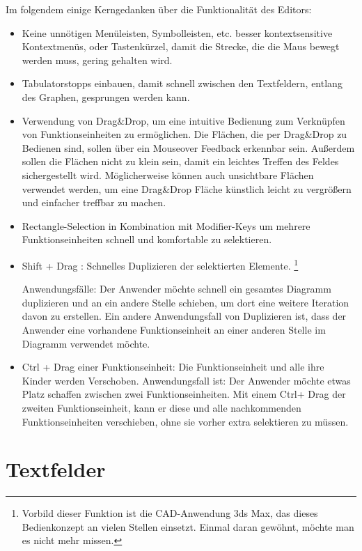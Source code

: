 \bigskip
Im folgendem einige Kerngedanken über die Funktionalität des Editors:

\begin{itemize}
\item Keine unnötigen Menüleisten, Symbolleisten, etc. besser kontextsensitive
Kontextmenüs, oder Tastenkürzel,  damit die Strecke, die die Maus bewegt werden muss, gering
gehalten wird.
\item Tabulatorstopps einbauen, damit schnell zwischen den Textfeldern, entlang des
Graphen, gesprungen werden kann.
\item Verwendung von Drag\&Drop, um eine intuitive Bedienung zum Verknüpfen von
Funktionseinheiten zu ermöglichen. Die Flächen, die per Drag\&Drop zu Bedienen
sind, sollen über ein Mouseover Feedback erkennbar sein. Außerdem sollen die
Flächen nicht zu klein sein, damit ein leichtes Treffen des Feldes
sichergestellt wird. Möglicherweise können auch unsichtbare Flächen verwendet
werden, um eine Drag\&Drop Fläche künstlich leicht zu vergrößern und einfacher treffbar zu machen.
\item Rectangle-Selection in Kombination mit Modifier-Keys um mehrere Funktionseinheiten
schnell und komfortable zu selektieren.
\item Shift + Drag : Schnelles Duplizieren der selektierten Elemente. 
\footnote{Vorbild dieser Funktion ist die CAD-Anwendung 3ds Max, das dieses Bedienkonzept an vielen Stellen einsetzt.
Einmal daran gewöhnt, möchte man es nicht mehr missen.} 

Anwendungsfälle:
Der Anwender möchte  schnell ein gesamtes Diagramm duplizieren und an ein andere Stelle schieben, um dort eine weitere Iteration davon zu erstellen.
Ein andere Anwendungsfall von Duplizieren ist, dass der Anwender eine vorhandene
Funktionseinheit an einer anderen Stelle im Diagramm verwendet möchte. 

\item Ctrl + Drag einer Funktionseinheit: Die Funktionseinheit und alle ihre Kinder werden
Verschoben. Anwendungsfall ist: Der Anwender möchte etwas Platz schaffen
zwischen zwei Funktionseinheiten. Mit einem Ctrl+ Drag der zweiten Funktionseinheit,
kann er diese und alle nachkommenden Funktionseinheiten verschieben, ohne sie
vorher extra selektieren zu müssen.
\end{itemize}

\section{Textfelder}

